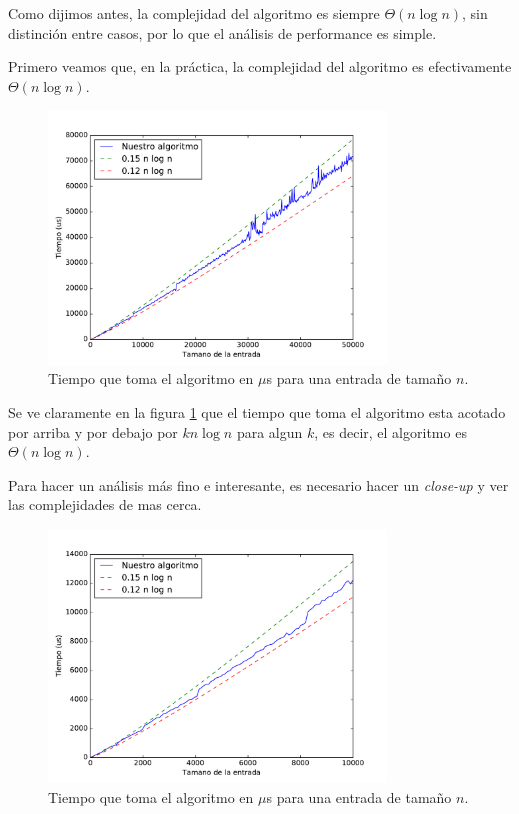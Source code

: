 Como dijimos antes, la complejidad del algoritmo es siempre $\Theta(n \log n)$, sin distinción entre casos, por lo que el análisis de performance es simple.

Primero veamos que, en la práctica, la complejidad del algoritmo es efectivamente $\Theta(n \log n)$.

\begin{figure}[H]
 \centering
	\includegraphics[width=0.8\textwidth]{img/tiempos/kaioken3.pdf}
	\caption{\footnotesize Tiempo que toma el algoritmo en $\mu$s para una entrada de tamaño $n$.}
	\label{fig:kaioken-tiempos3}
\end{figure}

Se ve claramente en la figura \ref{fig:kaioken-tiempos3} que el tiempo que toma el algoritmo esta acotado por arriba y por debajo por $k n \log n$ para algun $k$, es decir, el algoritmo es $\Theta(n \log n)$.

Para hacer un análisis más fino e interesante, es necesario hacer un \emph{close-up} y ver las complejidades de mas cerca.

\begin{figure}[H]
 \centering
	\includegraphics[width=0.8\textwidth]{img/tiempos/kaioken1.pdf}
	\caption{\footnotesize Tiempo que toma el algoritmo en $\mu$s para una entrada de tamaño $n$.}
	\label{fig:kaioken-tiempos1}
\end{figure}

